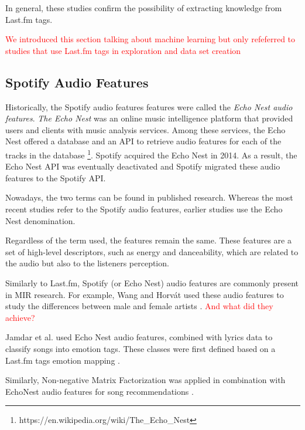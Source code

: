 \documentclass[sn-mathphys]{sn-jnl}%
\theoremstyle{thmstyleone}%
\theoremstyle{thmstyletwo}%
\theoremstyle{thmstylethree}%
\begin{document}

In general, these studies confirm the possibility of extracting knowledge from Last.fm tags.

\textcolor{red}{We introduced this section talking about machine learning but only refeferred to studies
that use Last.fm tags in exploration and data set creation}

\subsection{Spotify Audio Features}

Historically, the Spotify audio features features were called the \emph{Echo Nest audio features}.
\emph{The Echo Nest} was an online music intelligence platform that provided users and clients with music analysis services.
Among these services, the Echo Nest offered a database and an API to retrieve audio features for each of the tracks in the database \footnote[3]{https://en.wikipedia.org/wiki/The\_Echo\_Nest}.
Spotify acquired the Echo Nest in 2014.
As a result, the Echo Nest API was eventually deactivated and Spotify migrated these audio features to the Spotify API.

Nowadays, the two terms can be found in published research.
Whereas the most recent studies refer to the Spotify audio features,
earlier studies use the Echo Nest denomination.

Regardless of the term used, the features remain the same.
These features are a set of high-level descriptors, such as energy and danceability,
which are related to the audio but also to the listeners perception.

Similarly to Last.fm, Spotify (or Echo Nest) audio features are commonly present in MIR research.
For example, Wang and Horv{\'a}t used  these audio features to study the differences
between male and female artists \cite{wang2019gender}.
\textcolor{red}{And what did they achieve?}

Jamdar et al. used Echo Nest audio features, combined with lyrics data to classify songs into emotion tags.
These classes were first defined based on a Last.fm tags emotion mapping \cite{jamdar2015emotion}.

Similarly, Non-negative Matrix Factorization was applied in combination with EchoNest audio features
for song recommendations \cite{benzi2016song}.
\end{document}
